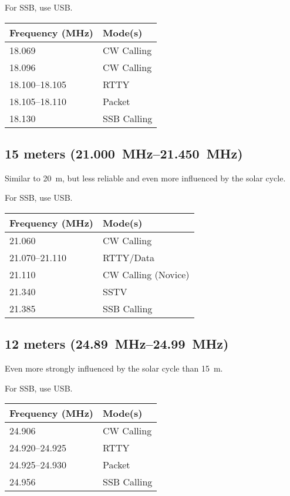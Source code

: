 \documentclass[11pt, twocolumn]{article}
\begin{document}
For SSB, use USB.
\begin{center}
  \begin{tabular}{l l}
    {Frequency (\si{\MHz})}			&	Mode(s)		\\
    \midrule
    \num{18.069}					&	CW Calling	\\
    \num{18.096}					&	CW Calling	\\
    \numrange{18.100}{18.105}		&	RTTY		\\
    \numrange{18.105}{18.110}		&	Packet		\\
    \num{18.130}					&	SSB Calling	\\
  \end{tabular}
\end{center}


\subsection{15 meters (\SIrange{21.000}{21.450}{\MHz})}
Similar to \SI{20}{m}, but less reliable and even more influenced
by the solar cycle.

For SSB, use USB.
\begin{center}
  \begin{tabular}{l l}
    {Frequency (\si{\MHz})}		&	Mode(s)				\\
    \midrule
    \num{21.060}				&	CW Calling			\\
    \numrange{21.070}{21.110}	&	RTTY/Data			\\
    \num{21.110}				&	CW Calling (Novice)	\\
    \num{21.340}				&	SSTV				\\
    \num{21.385}				&	SSB Calling			\\
  \end{tabular}
\end{center}


\subsection{12 meters (\SIrange{24.89}{24.99}{\MHz})}
Even more strongly influenced by the solar cycle than \SI{15}{m}.

For SSB, use USB.
\begin{center}
  \begin{tabular}{l l}
    {Frequency (\si{\MHz})}			&	Mode(s)		\\
    \midrule
    \num{24.906}					&	CW Calling	\\
    \numrange{24.920}{24.925}		&	RTTY		\\
    \numrange{24.925}{24.930}		&	Packet		\\
    \num{24.956}					&	SSB Calling	\\
  \end{tabular}
\end{center}
\end{document}
